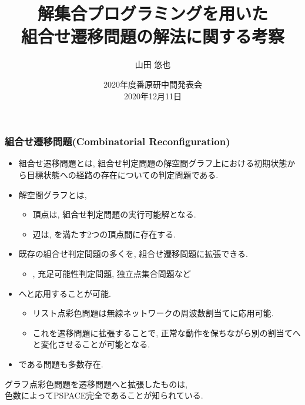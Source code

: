 \documentclass[dvipdfmx,11pt]{beamer}
\title[ASPを用いた組合せ遷移問題の解法に関する考察]{解集合プログラミングを用いた\\組合せ遷移問題の解法に関する考察}
\author{山田 悠也}
\date{2020年度番原研中間発表会\\2020年12月11日}
\institute{番原研究室}
\begin{document}
\begin{frame}\frametitle{}
  \titlepage
\end{frame}

\begin{frame}\frametitle{組合せ遷移問題(Combinatorial Reconfiguration)}

  \begin{itemize}
    \item \alert{組合せ遷移問題}とは, 組合せ判定問題の解空間グラフ上における初期状態から目標状態への経路の存在についての判定問題である.
    \item \alert{解空間グラフ}とは,
    \begin{itemize}
      \item 頂点は, 組合せ判定問題の実行可能解となる.
      \item 辺は, を満たす2つの頂点間に存在する.
    \end{itemize} 
    \item 既存の組合せ判定問題の多くを, 組合せ遷移問題に拡張できる.
    \begin{itemize}
      \item {}, 充足可能性判定問題, 独立点集合問題など
    \end{itemize}
    \item {}へと応用することが可能.
    \begin{itemize}
      \item リスト点彩色問題は無線ネットワークの周波数割当てに応用可能.
      \item これを遷移問題に拡張することで, 正常な動作を保ちながら別の割当てへと変化させることが可能となる.
    \end{itemize}
    \item {}である問題も多数存在.
  \end{itemize}

  \begin{alertblock}{}
    \centering
    グラフ点彩色問題を遷移問題へと拡張したものは,\\色数によってPSPACE完全であることが知られている.
  \end{alertblock}

\end{frame}
\end{document}

